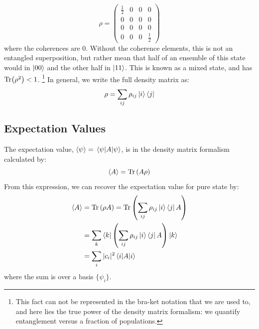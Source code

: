 \begin{equation}
    \rho = 
    \begin{pmatrix}
        \frac{1}{2} & 0 & 0 & 0 \\
        0 & 0 & 0 & 0 \\
        0 & 0 & 0 & 0 \\
        0 & 0 & 0 & \frac{1}{2}
    \end{pmatrix}
\end{equation}
where the coherences are $0$. Without the coherence elements, this is not an entangled superposition, but rather mean that half of an ensemble of this state would in $\ket{00}$ and the other half in $\ket{11}$. This is known as a mixed state, and has $\Tr(\rho^2)<1$. \footnote{This fact can not be represented in the bra-ket notation that we are used to, and here lies the true power of the density matrix formalism: we quantify entanglement versus a fraction of populations.}
In general, we write the full density matrix as:
\begin{equation}
    \rho = \sum_{ij} \rho_{ij} \ket{i}\bra{j}
\end{equation}

\subsection{Expectation Values}
The expectation value, $\expval{\psi} = \mel{\psi}{A}{\psi}$, is in the density matrix formalism calculated by:
\begin{equation}
    \expval{A} = \Tr \left(A\rho\right)
\end{equation}
From this expression, we can recover the expectation value for pure state by:
\begin{align}
   \expval{A}  &= \Tr\left(\rho A\right) = \Tr\left(\sum_{ij}\rho_{ij}\ket{i}\bra{j} A\right) \\
               &= \sum_k \bra{k}\left(\sum_{ij}\rho_{ij}\ket{i}\bra{j} A\right) \ket{k}\\
               &= \sum_i |c_i|^2 \mel{i}{A}{i}
\end{align}
where the sum is over a basis $\{\psi_i\}$.


